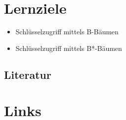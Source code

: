 \section*{Lernziele}
\begin{itemize}
	\item Schlüsselzugriff mittels B-Bäumen
	\item Schlüsselzugriff mittels B*-Bäumen
\end{itemize}

\begin{normalText}
\section*{Literatur}



\end{normalText}

\section*{Links}
\begin{description}
\ViseAuD
\end{description}
